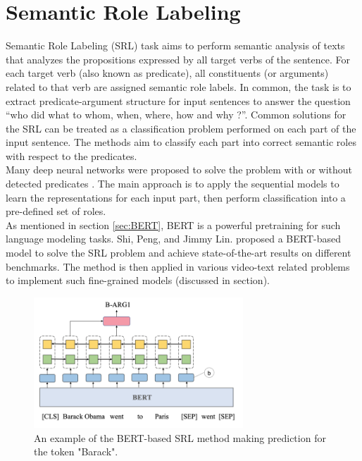 \section{Semantic Role Labeling}
\label{sec:srl}
Semantic Role Labeling (SRL) task aims to perform semantic analysis of texts that analyzes the propositions expressed by all target verbs of the sentence. 
For each target verb (also known as predicate), all constituents (or arguments) related to that verb are assigned semantic role labels. In common, the task is to extract predicate-argument structure for input sentences to answer the question “who did what to whom, when, where, how and why ?”.
Common solutions for the SRL can be treated as a classification problem performed on each part of the input sentence. 
The methods  aim to classify each part into correct semantic roles with respect to the predicates. \\
Many deep neural networks were proposed to solve the problem with or without detected predicates \cite{zhou2015end, marcheggiani2017simple, he2017deep, tan2018deep, he2018jointly, strubell2018linguistically}. 
The main approach is to apply the sequential models to learn the representations for each input part, then perform classification into a pre-defined set of roles.\\ 
As mentioned in section \ref{sec:BERT}, BERT is a powerful pretraining for such language modeling tasks. Shi, Peng, and Jimmy Lin.\cite{shi2019simple} proposed a BERT-based model to solve the SRL problem and achieve state-of-the-art results on different benchmarks. The method is then applied in various video-text related problems to implement such fine-grained models (discussed in section). 
\begin{figure}[t!]
    \centering
    \includegraphics[width=0.7\textwidth]{resources/images/SRL_overview.png}
    \caption{An example of the BERT-based SRL method \cite{shi2019simple} making prediction for the token "Barack".}
    \label{fig:srl_overview}
\end{figure}
